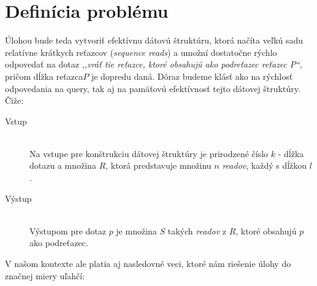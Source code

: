
\section{Definícia problému}

Úlohou bude teda vytvoriť efektívnu dátovú štruktúru, ktorá načíta veľkú sadu
relatívne krátkych reťazcov (\emph{sequence reads}) a umožní dostatočne rýchlo odpovedať na dotaz \emph{,,vráť tie
reťazce, ktoré obsahujú ako podreťazec reťazec $P$``}, pričom dĺžka reťazca$P$
je dopredu daná. Dôraz budeme klásť ako na rýchlosť odpovedania na query, tak aj
na pamäťovú efektívnosť tejto dátovej štruktúry. Čiže:

\begin{description}
    \item[Vstup] \hfill \\
        Na vstupe pre konštrukciu dátovej štruktúry je prirodzené číslo $k$ -
        dĺžka dotazu a množina $R$, ktorá predstavuje množinu $n$ \emph{readov},
        každý s dĺžkou $l$.
    \item[Výstup] \hfill \\
        Výstupom pre dotaz $p$ je množina $S$ takých \emph{readov} z $R$, ktoré
        obsahujú $p$ ako podreťazec.
\end{description}


V našom kontexte ale platia aj nasledovné veci, ktoré nám riešenie úlohy do
značnej miery uľahčí:

